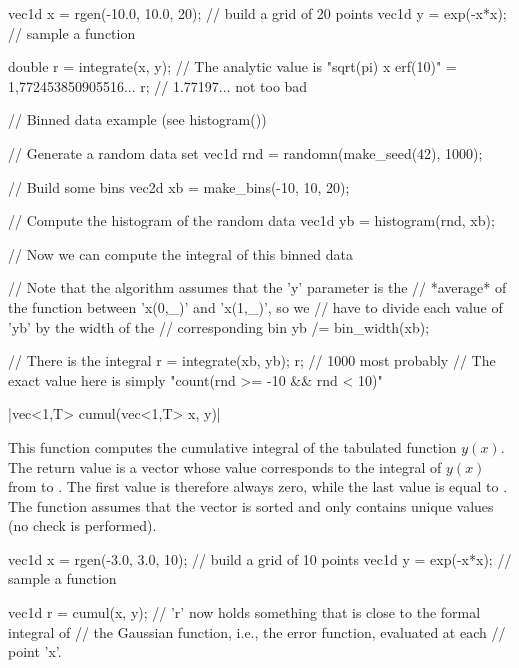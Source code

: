 \begin{example}
\begin{cppcode}
vec1d x = rgen(-10.0, 10.0, 20); // build a grid of 20 points
vec1d y = exp(-x*x);             // sample a function

double r = integrate(x, y);
// The analytic value is "sqrt(pi) x erf(10)" = 1,772453850905516...
r; // 1.77197... not too bad

// Binned data example (see histogram())

// Generate a random data set
vec1d rnd = randomn(make_seed(42), 1000);

// Build some bins
vec2d xb = make_bins(-10, 10, 20);

// Compute the histogram of the random data
vec1d yb = histogram(rnd, xb);

// Now we can compute the integral of this binned data

// Note that the algorithm assumes that the 'y' parameter is the
// *average* of the function between 'x(0,_)' and 'x(1,_)', so we
// have to divide each value of 'yb' by the width of the
// corresponding bin
yb /= bin_width(xb);

// There is the integral
r = integrate(xb, yb);
r; // 1000 most probably
// The exact value here is simply "count(rnd >= -10 && rnd < 10)"
\end{cppcode}
\end{example}


\funcitem \cppinline|vec<1,T> cumul(vec<1,T> x, y)| 

This function computes the cumulative integral of the tabulated function $y(x)$. The return value is a vector whose value  corresponds to the integral of $y(x)$ from  to . The first value is therefore always zero, while the last value is equal to . The function assumes that the vector  is sorted and only contains unique values (no check is performed).

\begin{example}
\begin{cppcode}
vec1d x = rgen(-3.0, 3.0, 10); // build a grid of 10 points
vec1d y = exp(-x*x);           // sample a function

vec1d r = cumul(x, y);
// 'r' now holds something that is close to the formal integral of
// the Gaussian function, i.e., the error function, evaluated at each
// point 'x'.
\end{cppcode}
\end{example}
